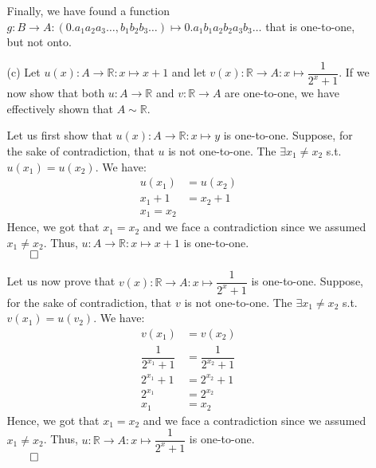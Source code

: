 \documentclass[11pt]{article}
\newcommand{\reals}{\mathbb{R}}
\begin{document}
\begin{itemize}
\begin{itemize}
                    Finally, we have found a function $g : B \to A :
                    (0.a_1a_2a_3\dots, b_1b_2b_3\dots) \mapsto
                    0.a_1b_1a_2b_2a_3b_3\dots$ that is one-to-one, but not
                    onto.

                \item[(c)]
                    Let $u(x) : A \to \reals : x \mapsto x + 1$ and let $v(x) :
                    \reals \to A : x \mapsto \dfrac{1}{2^x + 1}$. If we now
                    show that both $u : A \to \reals$ and $v : \reals \to A$
                    are one-to-one, we have effectively shown that $A \sim
                    \reals$.

                    Let us first show that $u(x) : A \to \reals : x \mapsto y$
                    is one-to-one. Suppose, for the sake of contradiction, that
                    $u$ is not one-to-one. The $\exists x_1 \neq x_2$ s.t.
                    $u(x_1) = u(x_2)$. We have:
                    \begin{align*}
                        u(x_1)  &= u(x_2)\\
                        x_1 + 1 &= x_2 + 1\\
                        x_1 = x_2
                    \end{align*}
                    Hence, we got that $x_1 = x_2$ and we face a contradiction
                    since we assumed $x_1 \neq x_2$. Thus, $u : A \to \reals :
                    x \mapsto x + 1$ is one-to-one.\\
                    $\qed$

                    Let us now prove that $v(x) : \reals \to A : x \mapsto
                    \dfrac{1}{2^x + 1}$ is one-to-one. Suppose, for the sake of
                    contradiction, that $v$ is not one-to-one. The $\exists x_1
                    \neq x_2$ s.t. $v(x_1) = u(v_2)$. We have:
                    \begin{align*}
                        v(x_1)                 &= v(x_2)\\
                        \dfrac{1}{2^{x_1} + 1} &= \dfrac{1}{2^{x_2} + 1}\\
                        2^{x_1} + 1            &= 2^{x_2} + 1\\
                        2^{x_1}                &= 2^{x_2}\\
                        x_1                    &= x_2
                    \end{align*}
                    Hence, we got that $x_1 = x_2$ and we face a contradiction
                    since we assumed $x_1 \neq x_2$. Thus, $u : \reals \to A :
                    x \mapsto \dfrac{1}{2^x + 1}$ is one-to-one.\\
                    $\qed$


\end{itemize}
\end{itemize}
\end{document}
